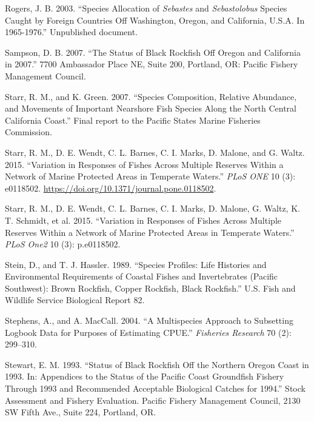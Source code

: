 \documentclass[11pt,
  english,
  letterpaper,
]{article}
\newlength{\cslhangindent}
\newenvironment{CSLReferences}[2] %
 {%
  \setlength{\parindent}{0pt}
  \ifodd #1 \everypar{\setlength{\hangindent}{\cslhangindent}}\ignorespaces\fi
  \ifnum #2 > 0
  \setlength{\parskip}{#2\baselineskip}
  \fi
 }%
 {}
\begin{document}
\begin{CSLReferences}{1}{0}
\leavevmode{}%
Rogers, J. B. 2003. {``Species Allocation of \emph{{Sebastes}} and \emph{Sebastolobus} Species Caught by Foreign Countries Off {Washington}, {Oregon}, and {California}, {U}.{S}.{A}. In 1965-1976.''} Unpublished document.

\leavevmode{}%
Sampson, D. B. 2007. {``The Status of Black Rockfish Off Oregon and California in 2007.''} 7700 Ambassador Place NE, Suite 200, Portland, OR: Pacific Fishery Management Council.

\leavevmode{}%
Starr, R. M., and K. Green. 2007. {``Species Composition, Relative Abundance, and Movements of Important Nearshore Fish Species Along the North Central California Coast.''} Final report to the Pacific States Marine Fisheries Commission.

\leavevmode{}%
Starr, R. M., D. E. Wendt, C. L. Barnes, C. I. Marks, D. Malone, and G. Waltz. 2015. {``Variation in Responses of Fishes Across Multiple Reserves Within a Network of Marine Protected Areas in Temperate Waters.''} \emph{PLoS ONE} 10 (3): e0118502. \url{https://doi.org/10.1371/journal.pone.0118502}.

\leavevmode{}%
Starr, R. M., D. E. Wendt, C. L. Barnes, C. I. Marks, D. Malone, G. Waltz, K. T. Schmidt, et al. 2015. {``Variation in Responses of Fishes Across Multiple Reserves Within a Network of Marine Protected Areas in Temperate Waters.''} \emph{PLoS One2} 10 (3): p.e0118502.

\leavevmode{}%
Stein, D., and T. J. Hassler. 1989. {``Species Profiles: Life Histories and Environmental Requirements of Coastal Fishes and Invertebrates (Pacific Southwest): Brown Rockfish, Copper Rockfish, Black Rockfish.''} U.S. Fish and Wildlife Service Biological Report 82.

\leavevmode{}%
Stephens, A., and A. MacCall. 2004. {``A Multispecies Approach to Subsetting Logbook Data for Purposes of Estimating {CPUE}.''} \emph{Fisheries Research} 70 (2): 299--310.

\leavevmode{}%
Stewart, E. M. 1993. {``Status of Black Rockfish Off the Northern Oregon Coast in 1993. In: Appendices to the Status of the Pacific Coast Groundfish Fishery Through 1993 and Recommended Acceptable Biological Catches for 1994.''} Stock Assessment and Fishery Evaluation. Pacific Fishery Management Council, 2130 SW Fifth Ave., Suite 224, Portland, OR.


\end{CSLReferences}
\end{document}
